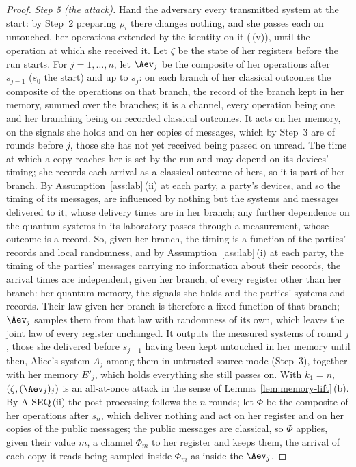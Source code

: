 \begin{proof}
\emph{Step 5 (the attack).} Hand the adversary every transmitted system at the
start: by Step~2 preparing $\rho_i$ there changes nothing, and she passes
each on untouched, her operations extended by the identity on it
(\,(v)), until the operation at
which she received it. Let $\zeta$ be the state of her registers before the
run starts. For $j=1,\dots,n$, let $\Aev_j$ be the composite of her operations
after $s_{j-1}$ ($s_0$ the start) and up to $s_j$: on each branch of her
classical outcomes the composite of the operations on that branch, the record
of the branch kept in her memory, summed over the branches; it is a channel,
every operation being one and her branching being on recorded classical
outcomes. It acts on her memory, on the signals she holds and on her copies
of messages, which by Step~3 are of rounds before $j$, those she has not yet
received being passed on unread. The time at which a copy reaches her is set
by the run and may depend on its devices' timing; she records each arrival
as a classical outcome of hers, so it is part of her branch. By
Assumption~\ref{ass:lab}\,(ii) at each party, a party's devices, and so the
timing of its messages, are influenced by nothing but the systems and
messages delivered to it, whose delivery times are in her branch; any
further dependence on the quantum systems in its laboratory passes through a
measurement, whose outcome is a record. So, given her branch, the timing is
a function of the parties' records and local randomness, and by
Assumption~\ref{ass:lab}\,(i) at each party, the timing of the parties'
messages carrying no information about their records, the arrival times are
independent, given her branch, of every register other than her branch: her
quantum memory, the signals she holds and the parties' systems and records.
Their law given her branch is therefore a fixed function of that branch;
$\Aev_j$ samples them from that law with randomness of its own, which leaves
the joint law of every register unchanged. It outputs the measured systems of round
$j$, those she delivered before $s_{j-1}$ having been kept untouched in her
memory until then, Alice's system $A_j$ among them in untrusted-source mode
(Step~3), together
with her memory $E'_j$, which holds everything she still passes on. With
$k_1=n$, $(\zeta,(\Aev_j)_j)$ is an all-at-once attack in the sense of
Lemma~\ref{lem:memory-lift}\,(b). By A-SEQ\,(ii) the post-processing follows
the $n$ rounds; let $\Phi$ be the composite of her operations after $s_n$,
which deliver nothing and act on her register and on her copies of the public
messages;
the public messages are classical, so $\Phi$ applies, given their value $m$,
a channel $\Phi_m$ to her register and keeps them, the arrival of each copy
it reads being sampled inside $\Phi_m$ as inside the $\Aev_j$.


\end{proof}
